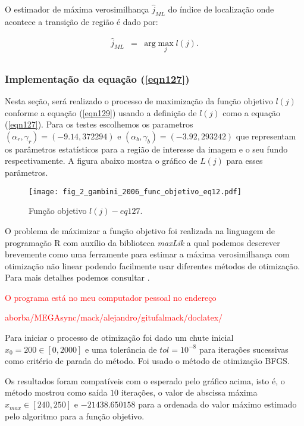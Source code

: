 O estimador de máxima verosimilhança $\widehat{j}_{ML}$ do índice de localização onde acontece a transição de região é dado por:

\begin{equation}\label{eqn129}
\begin{array}{rcl}
	\widehat{j}_{ML}&=&\text{arg}\max\limits_{j}l(j).  \\
\end{array}
\end{equation}

\subsubsection{Implementação da equação (\ref{eqn127})}


Nesta seção, será realizado o processo de maximização da função objetivo $l(j)$ conforme a equação (\ref{eqn129}) usando a definição de $l(j)$ como a equação (\ref{eqn127}). Para os testes escolhemos os parametros $(\alpha_r, \gamma_r)=(-9.14, 372294)$ e $(\alpha_b,\gamma_b)=(-3.92,293242)$ que representam os parâmetros estatísticos para a região de interesse da imagem e o seu fundo respectivamente. A figura abaixo mostra o gráfico de $L(j)$ para esses parâmetros.  

\begin{figure}[hbt]
\centering
\texttt{[image: fig\_2\_gambini\_2006\_func\_objetivo\_eq12.pdf]}
	\caption{Função objetivo $l(j) -  eq127$.}
\label{fig1}
\end{figure}

O problema de máximizar a função objetivo foi realizada na linguagem de programação R com auxílio da biblioteca {\it maxLik} a qual podemos descrever brevemente como uma ferramente para estimar a máxima verosimilhança com otimização não linear podendo facilmente usar diferentes métodos de otimização. Para mais detalhes podemos consultar \cite{ht}.


\textcolor{red}{O programa está no meu computador pessoal no endereço}

\textcolor{red}{aborba/MEGAsync/mack/alejandro/gitufalmack/doclatex/}

Para iniciar o processo de otimização foi dado um chute inicial $x_0=200\in[0,2000]$ e uma tolerância de $tol=10^{-8}$ para iterações sucessivas como critério de parada do método. Foi usado o método de otimização BFGS.

Os resultados foram compatíveis com o esperado pelo gráfico acima, isto é, o método mostrou como saída $10$ iterações, o valor de abscissa máxima $x_{max}\in[240,250]$ e $-21438.650158$ para a ordenada do valor máximo estimado pelo algoritmo para a função objetivo.

